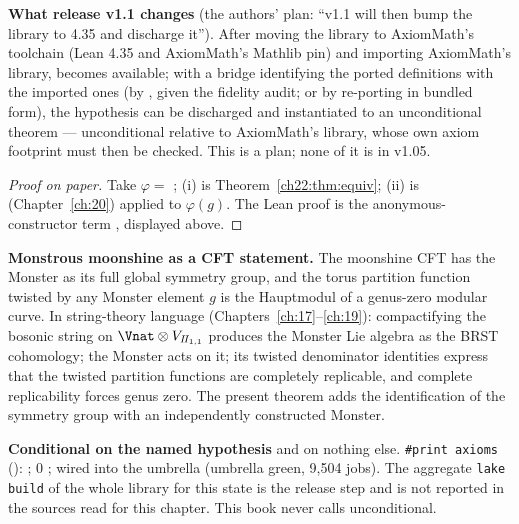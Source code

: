 \begin{dictionary}
\textbf{What release v1.1 changes} (the authors' plan: ``v1.1 will then bump the library to 4.35 and
discharge it'').  After moving the library to AxiomMath's toolchain (Lean 4.35 and AxiomMath's Mathlib pin) and importing
AxiomMath's library,  becomes available; with a bridge identifying the ported definitions with the
imported ones (by , given the fidelity audit; or by re-porting  in bundled form), the hypothesis can be
discharged and  instantiated to an unconditional theorem --- unconditional relative to AxiomMath's
library, whose own axiom footprint must then be checked.  This is a plan; none of it is in v1.05.
\end{dictionary}

\begin{proof}[Proof on paper]
Take $\varphi=$ ; (i) is Theorem~\ref{ch22:thm:equiv}; (ii) is  (Chapter~\ref{ch:20})
applied to $\varphi(g)$.  The Lean proof is the anonymous-constructor term
, displayed above.
\end{proof}

\begin{physics}
\textbf{Monstrous moonshine as a CFT statement.}  The moonshine CFT has the Monster as its full global symmetry group, and the
torus partition function twisted by any Monster element $g$ is the Hauptmodul of a genus-zero modular curve.  In string-theory
language (Chapters~\ref{ch:17}--\ref{ch:19}): compactifying the bosonic string on $\Vnat\otimes V_{I\!I_{1,1}}$ produces the
Monster Lie algebra as the BRST cohomology; the Monster acts on it; its twisted denominator identities express that the
twisted partition functions are completely replicable, and complete replicability forces genus zero.  The present theorem
adds the identification of the symmetry group with an independently constructed Monster.
\end{physics}

\begin{status}
\textbf{Conditional on the named hypothesis } and on nothing else.  \texttt{\#print axioms}
(): ; $0$ ; wired
into the umbrella  (umbrella green, 9,504 jobs).  The aggregate
\texttt{lake build} of the whole library for this state is the release step and is not reported in the sources read for this
chapter.  This book never calls  unconditional.
\end{status}


